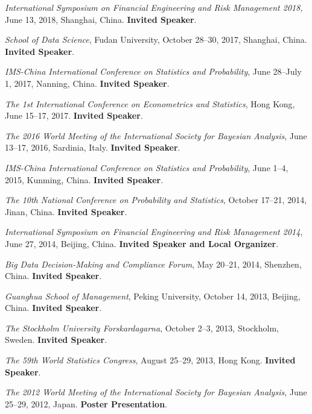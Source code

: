 \documentclass[twoside,a4paper]{article}
\begin{document}
\begin{etaremune}[itemsep=0ex,parsep=0pt]
\item \textit{International Symposium on Financial Engineering and Risk Management 2018}, June 13, 2018, Shanghai, China. \textbf{Invited Speaker}.

\item \textit{School of Data Science}, Fudan University, October 28--30, 2017, Shanghai, China. \textbf{Invited Speaker}.

\item \textit{IMS-China International Conference on Statistics and Probability}, June 28--July 1, 2017, Nanning, China. \textbf{Invited Speaker}.

\item \textit{The 1st International Conference on Econometrics and Statistics}, Hong Kong, June 15--17, 2017. \textbf{Invited Speaker}.

\item \textit{The 2016 World Meeting of the International Society for Bayesian Analysis}, June 13--17, 2016, Sardinia, Italy. \textbf{Invited Speaker}.

\item \textit{IMS-China International Conference on Statistics and Probability}, June 1--4, 2015, Kunming, China. \textbf{Invited Speaker}.

\item \textit{The 10th National Conference on Probability and Statistics}, October 17--21, 2014, Jinan, China. \textbf{Invited Speaker}.

\item \textit{International Symposium on Financial Engineering and Risk Management 2014}, June 27, 2014, Beijing, China. \textbf{Invited Speaker and Local Organizer}.

\item \textit{Big Data Decision-Making and Compliance Forum}, May 20--21, 2014, Shenzhen, China. \textbf{Invited Speaker}.

\item \textit{Guanghua School of Management}, Peking University, October 14, 2013, Beijing, China. \textbf{Invited Speaker}.

\item \textit{The Stockholm University Forskardagarna}, October 2--3, 2013, Stockholm, Sweden. \textbf{Invited Speaker}.

\item \textit{The 59th World Statistics Congress}, August 25--29, 2013, Hong Kong. \textbf{Invited Speaker}.

\item \textit{The 2012 World Meeting of the International Society for Bayesian Analysis}, June 25--29, 2012, Japan. \textbf{Poster Presentation}.


\end{etaremune}
\end{document}
